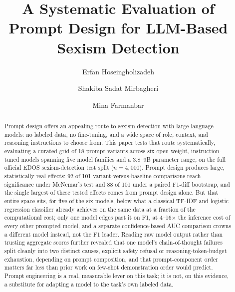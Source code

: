 \documentclass[runningheads]{llncs}
\title{A Systematic Evaluation of Prompt Design for LLM-Based Sexism
Detection}
\author{Erfan Hoseingholizadeh \and Shakiba Sadat Mirbagheri \and Mina Farmanbar}
\institute{}
\begin{document}
\maketitle

\begingroup
\renewcommand\thefootnote{}
\endgroup

\begin{abstract}
Prompt design offers an appealing route to sexism detection with large
language models: no labeled data, no fine-tuning, and a wide space of
role, context, and reasoning instructions to choose from. This paper
tests that route systematically, evaluating a curated grid of 18 prompt
variants across six open-weight, instruction-tuned models spanning five
model families and a 3.8--9B parameter range, on the full official EDOS
sexism-detection test split ($n=4{,}000$). Prompt design produces large,
statistically real effects: 92 of 101 variant-versus-baseline
comparisons reach significance under McNemar's test and 88 of 101 under
a paired F1-diff bootstrap, and the single largest of these tested
effects comes from prompt design alone.
But that entire space sits, for five of the six models, below what a
classical TF-IDF and logistic regression classifier already achieves on
the same data at a fraction of the computational cost; only one model
edges past it on F1, at 4--16$\times$ the inference cost of every other
prompted model, and a separate confidence-based AUC comparison crowns a
different model instead, not the F1 leader. Reading raw model output rather
than trusting aggregate scores further revealed that one model's
chain-of-thought failures split cleanly into two distinct causes,
explicit safety refusal or reasoning-token-budget exhaustion, depending
on prompt composition, and that prompt-component order matters far less
than prior work on few-shot demonstration order would predict. Prompt
engineering is a real, measurable lever on this task; it is not, on this
evidence, a substitute for adapting a model to the task's own labeled
data.

\end{abstract}



















\end{document}
